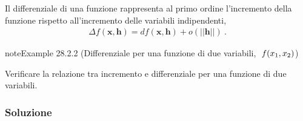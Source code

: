 \documentclass[letterpaper,10pt,italian]{jupyterBook}
\begin{document}
\sphinxAtStartPar
Il differenziale di una funzione rappresenta al primo ordine l’incremento della funzione rispetto all’incremento delle variabili indipendenti,
\begin{equation*}
\begin{split} \Delta f(\mathbf{x}, \mathbf{h}) = df(\mathbf{x}, \mathbf{h}) + o(||\mathbf{h}||)\ .\end{split}
\end{equation*}\label{ch/multivariable-calculus/derivatives:multivariable-calculus:differential}
\begin{sphinxadmonition}{note}{Example 28.2.2 (Differenziale per una funzione di due variabili, \protect\(\ f(x_1, x_2) \protect\))}



\sphinxAtStartPar
Verificare la relazione tra incremento e differenziale per una funzione di due variabili.
\subsubsection*{Soluzione}


\end{sphinxadmonition}
\end{document}
